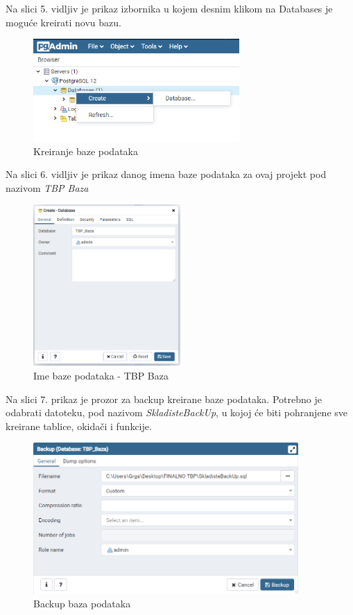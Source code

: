 \documentclass{foi}
\begin{document}
\newpage
Na slici 5. vidljiv je prikaz izbornika u kojem desnim klikom na Databases je moguće kreirati novu bazu.
\begin{figure}[h]
    \centering 
    \includegraphics[width=0.7\textwidth]{slike/kreiranje baze.PNG}
    \caption{Kreiranje baze podataka}
    \label{slika-5}
\end{figure}

Na slici 6. vidljiv je prikaz danog imena baze podataka za ovaj projekt pod nazivom \emph{TBP Baza}

\begin{figure}[h]
    \centering 
    \includegraphics[width=0.5\textwidth]{slike/ime baze.PNG}
    \caption{Ime baze podataka - TBP Baza}
    \label{slika-6}
\end{figure}

\newpage
Na slici 7. prikaz je prozor za backup kreirane baze podataka. Potrebno je odabrati datoteku, pod nazivom \emph{SkladisteBackUp}, u kojoj će biti pohranjene sve kreirane tablice, okidači i funkcije. 
\begin{figure}[h]
    \centering 
    \includegraphics[width=0.9\textwidth]{slike/Back up baze podataka.PNG}
    \caption{Backup baza podataka}
    \label{slika-7}
\end{figure}
\end{document}
